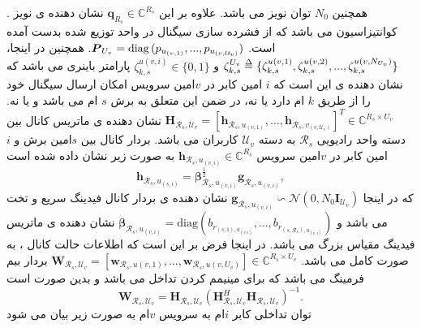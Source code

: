 .
همچنین
$N_0$
توان نویز می باشد.
علاوه بر این
$\boldsymbol{q}_{R_s} \in \mathbb{C}^{{R}_s }  $
نشان دهنده ی نویز کوانتیزاسیون می باشد که از فشرده سازی سیگنال  در واحد توزیع شده بدست آمده است.
$\boldsymbol{P}_{U_v} = \mathop{\mathrm{diag}}{(p_{u_{(v,1)}}, ..., p_{u_{(v,\mathcal{U}_v)}})}$.
همچنین در اینجا، 
$\zeta_{k,s}^{U_v} \delequal \{\zeta_{k,s}^{u(v,1)},\zeta_{k,s}^{u(v,2)},...,\zeta_{k,s}^{u(v,N_{U_v})}\}$
و 
$\zeta_{k,s}^{u(v,i)} \in \{0,1\}$
پارامتر باینری می باشد که نشان دهنده ی این است که $i$ امین کابر در $v$امین سرویس امکان ارسال سیگنال خود را از طریق 
$k$
ام دارد یا نه، در ضمن این  
 متعلق به برش $s$ ام می باشد و یا نه.
 $\boldsymbol{H}_{\mathcal{R}_s,\mathcal{U}_v}=\left[\boldsymbol{h}_{\mathcal{R}_s,u_{(v,1)}},\ldots,\boldsymbol{h}_{\mathcal{R}_s,v_{(v,\mathcal{U}_v)}}\right]^T  \in \mathbb{C}^{{R}_s\times {U}_v }$
نشان دهنده ی ماتریس کانال بین دسته واحد رادیویی 
 $\mathcal{R}_s$
 به دسته 
 $\mathcal{U}_v$
 کاربران می باشد.
بردار کانال بین $s$امین برش و $i$امین کابر در $v$امین سرویس $\boldsymbol{h}_{\mathcal{R}_s,u_{(v,i)}}\in \mathbb{C}^{{R}_s}$ به صورت زیر نشان داده شده است 
\begin{equation}
\boldsymbol{h}_{\mathcal{R}_s,u_{(s,i)}} = \boldsymbol{\beta}^\frac{1}{2}_{\mathcal{R}_s,u_{(v,i)}} \boldsymbol{g}_{\mathcal{R}_s,u_{(v,i)}},
\end{equation} 
که در اینجا 
$\boldsymbol{g}_{\mathcal{R}_s,u_{(v,i)}} \backsim \mathcal{N}(0,N_0\boldsymbol{I}_{\mathcal{U}_v})$
نشان دهنده ی بردار کانال فیدینگ سریع و تخت می باشد و
 $\boldsymbol{\beta}_{\mathcal{R}_s,u_{(v,i)}}=\text{diag}(b_{r_{(s,1),u_{(v,i)}}},\ldots,b_{r_{(s,\mathcal{R}_s),u_{(v,i)}}})$
 نشان دهنده ی ماتریس فیدینگ مقیاس بزرگ می باشد.
در اینجا فرض بر این است که اطلاعات حالت کانال ، به صورت کامل می باشد.\newline
 $\boldsymbol{W}_{\mathcal{R}_s,\mathcal{U}_v} = [\boldsymbol{w}_{\mathcal{R}_s,u(v,1)},...,\boldsymbol{w}_{\mathcal{R}_s,u(v,U_v)}] \in \mathbb{C}^{{R}_s\times U_v} $
 بردار بیم فرمینگ 
  می باشد که برای مینیمم کردن تداخل می باشد و بدین صورت است
\begin{equation}
\textstyle \boldsymbol{W}_{\mathcal{R}_s,\mathcal{U}_v} = \boldsymbol{H}_{\mathcal{R}_s,\mathcal{U}_v}(\boldsymbol{H}_{\mathcal{R}_s,\mathcal{U}_v}^H \boldsymbol{H}_{\mathcal{R}_s,\mathcal{U}_v})^{-1}.
\end{equation}  
توان تداخلی کابر $i$ام به سرویس $v$ام به صورت زیر بیان می شود
